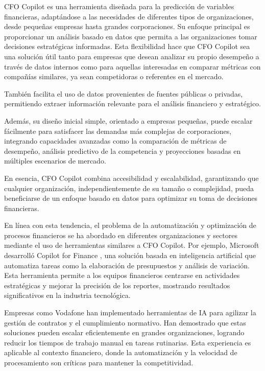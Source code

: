\documentclass[12pt,letterpaper,oneside]{report}
\renewcommand{\_}{\UnderscoreOriginal\allowbreak}
\begin{document}
CFO Copilot es una herramienta diseñada para la predicción de variables financieras, adaptándose a las necesidades de diferentes tipos de organizaciones, desde pequeñas empresas hasta grandes corporaciones. Su enfoque principal es proporcionar un análisis basado en datos que permita a las organizaciones tomar decisiones estratégicas informadas. Esta flexibilidad hace que CFO Copilot sea una solución útil tanto para empresas que desean analizar su propio desempeño a través de datos internos como para aquellas interesadas en comparar métricas con compañías similares, ya sean competidoras o referentes en el mercado.

También facilita el uso de datos provenientes de fuentes públicas o privadas, permitiendo extraer información relevante para el análisis financiero y estratégico.

Además, su diseño inicial simple, orientado a empresas pequeñas, puede escalar fácilmente para satisfacer las demandas más complejas de corporaciones, integrando capacidades avanzadas como la comparación de métricas de desempeño, análisis predictivo de la competencia y proyecciones basadas en múltiples escenarios de mercado.

En esencia, CFO Copilot combina accesibilidad y escalabilidad, garantizando que cualquier organización, independientemente de su tamaño o complejidad, pueda beneficiarse de un enfoque basado en datos para optimizar su toma de decisiones financieras.

En línea con esta tendencia, el problema de la automatización y optimización de procesos financieros se ha abordado en diferentes organizaciones y sectores mediante el uso de herramientas similares a CFO Copilot. Por ejemplo, Microsoft desarrolló Copilot for Finance \parencite{Microsoft2025}, una solución basada en inteligencia artificial que automatiza tareas como la elaboración de presupuestos y análisis de variación. Esta herramienta permite a los equipos financieros centrarse en actividades estratégicas y mejorar la precisión de los reportes, mostrando resultados significativos en la industria tecnológica. \parencite{Cao2023}

Empresas como Vodafone han implementado herramientas de IA para agilizar la gestión de contratos y el cumplimiento normativo. Han demostrado que estas soluciones pueden escalar eficientemente en grandes organizaciones, logrando reducir los tiempos de trabajo manual en tareas rutinarias. Esta experiencia es aplicable al contexto financiero, donde la automatización y la velocidad de procesamiento son críticas para mantener la competitividad.
\end{document}
